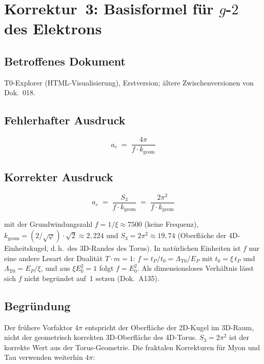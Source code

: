 \section{Korrektur~3: Basisformel für $g$-$2$ des Elektrons}

\subsection*{Betroffenes Dokument}

T0-Explorer (HTML-Visualisierung), Erstversion; ältere Zwischenversionen
von Dok.~018.

\subsection*{Fehlerhafter Ausdruck}

\begin{equation}
  a_e \;=\; \frac{4\pi}{f \cdot k_{\text{geom}}}
  \tag{alt -- falsch}
\end{equation}

\subsection*{Korrekter Ausdruck}

\begin{equation}
  \boxed{
    a_e \;=\; \frac{S_3}{f \cdot k_{\text{geom}}}
    \;=\; \frac{2\pi^2}{f \cdot k_{\text{geom}}}
  }
  \tag{186.4}
\end{equation}

mit der Grundwindungszahl $f = 1/\xi \approx 7500$ (keine Frequenz), $k_{\text{geom}} = (2/\sqrt{\varphi})\cdot\sqrt{2} \approx 2{,}224$
und $S_3 = 2\pi^2 \approx 19{,}74$ (Oberfläche der 4D-Einheitskugel,
d.\,h.\ des 3D-Randes des Torus). In natürlichen Einheiten ist $f$ nur eine andere Lesart der Dualität $T\cdot m = 1$: $f = t_P/t_0 = \Lambda_{\text{T0}}/E_P$ mit $t_0 = \xi\,t_P$ und $\Lambda_{\text{T0}} = E_P/\xi$, und aus $\xi E_0^2 = 1$ folgt $f = E_0^2$. Als dimensionsloses Verhältnis lässt sich $f$ nicht begründet auf~1 setzen (Dok.~A135).

\subsection*{Begründung}

Der frühere Vorfaktor $4\pi$ entspricht der Oberfläche der 2D-Kugel im
3D-Raum, nicht der geometrisch korrekten 3D-Oberfläche des 4D-Torus.
$S_3 = 2\pi^2$ ist der korrekte Wert aus der Torus-Geometrie. Die
fraktalen Korrekturen für Myon und Tau verwenden weiterhin $4\pi$:


